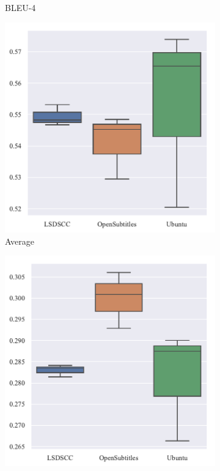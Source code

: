 \begin{figure}[H]
\begin{subfigure}{0.24\linewidth}
        \caption{BLEU-4}
    \end{subfigure}
    \begin{subfigure}{0.24\linewidth}
        \includegraphics[width=\linewidth]{figure/boxplot/dataset/embedding_based_vector_average/plot.pdf}
        \centering
        \caption{Average}
    \end{subfigure}%
    \begin{subfigure}{0.24\linewidth}
        \includegraphics[width=\linewidth]{figure/boxplot/dataset/embedding_based_vector_extrema/plot.pdf}

\end{subfigure}
\end{figure}
